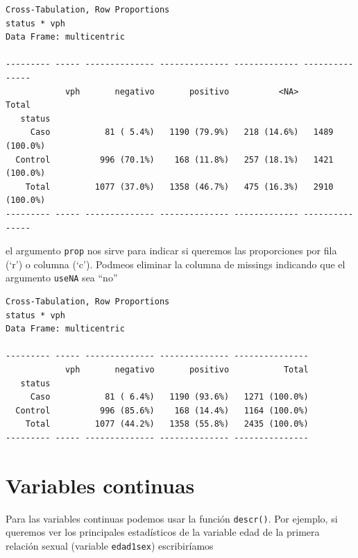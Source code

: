 \documentclass[
]{book}
\newenvironment{Shaded}{\begin{snugshade}}{\end{snugshade}}
\newcommand{\AttributeTok}[1]{\textcolor[rgb]{0.77,0.63,0.00}{#1}}
\newcommand{\FunctionTok}[1]{\textcolor[rgb]{0.00,0.00,0.00}{#1}}
\newcommand{\NormalTok}[1]{#1}
\newcommand{\SpecialCharTok}[1]{\textcolor[rgb]{0.00,0.00,0.00}{#1}}
\newcommand{\StringTok}[1]{\textcolor[rgb]{0.31,0.60,0.02}{#1}}
\begin{document}
\begin{verbatim}
Cross-Tabulation, Row Proportions  
status * vph  
Data Frame: multicentric  

--------- ----- -------------- -------------- ------------- ---------------
            vph       negativo       positivo          <NA>           Total
   status                                                                  
     Caso           81 ( 5.4%)   1190 (79.9%)   218 (14.6%)   1489 (100.0%)
  Control          996 (70.1%)    168 (11.8%)   257 (18.1%)   1421 (100.0%)
    Total         1077 (37.0%)   1358 (46.7%)   475 (16.3%)   2910 (100.0%)
--------- ----- -------------- -------------- ------------- ---------------
\end{verbatim}

el argumento \texttt{prop} nos sirve para indicar si queremos las proporciones por fila (`r') o columna (`c'). Podmeos eliminar la columna de missings indicando que el argumento \texttt{useNA} sea ``no''

\begin{Shaded}
\end{Shaded}

\begin{verbatim}
Cross-Tabulation, Row Proportions  
status * vph  
Data Frame: multicentric  

--------- ----- -------------- -------------- ---------------
            vph       negativo       positivo           Total
   status                                                    
     Caso           81 ( 6.4%)   1190 (93.6%)   1271 (100.0%)
  Control          996 (85.6%)    168 (14.4%)   1164 (100.0%)
    Total         1077 (44.2%)   1358 (55.8%)   2435 (100.0%)
--------- ----- -------------- -------------- ---------------
\end{verbatim}

\hypertarget{variables-continuas}{%
\section{Variables continuas}\label{variables-continuas}}

Para las variables continuas podemos usar la función \texttt{descr()}. Por ejemplo, si queremos ver los principales estadísticos de la variable edad de la primera relación sexual (variable \texttt{edad1sex}) escribiríamos
\end{document}
